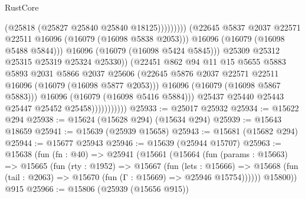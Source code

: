 \begin{lexlean}{RustCore}
\begin{coremodule}
                                                  (@25818 (@25827 @25840 @25840 @18125)))))))))
                                    (@22645
                                      @5837
                                      @2037
                                      @22571
                                      @22511
                                      @16096
                                      (@16079 (@16098 @5838 @2053)))
                                    @16096
                                    (@16079 (@16098 @5488 @5844)))
                                  @16096
                                  (@16079 (@16098 @5424 @5845)))
                                @25309
                                @25312
                                @25315
                                @25319
                                @25324
                                @25330))
                            (@22451
                              @862
                              @94
                              @11
                              @15
                              @5655
                              @5883
                              @5893
                              @2031
                              @5866
                              @2037
                              @25606
                              (@22645
                                @5876
                                @2037
                                @22571
                                @22511
                                @16096
                                (@16079 (@16098 @5877 @2053)))
                              @16096
                              (@16079 (@16098 @5867 @5883)))
                            @16096
                            (@16079 (@16098 @5416 @5884)))
                          @25437
                          @25440
                          @25443
                          @25447
                          @25452
                          @25458)))))))))))
@25933 := @25017 @25932
@25934 := @15622 @294
@25938 := @15624 (@15628 @294) (@15634 @294)
@25939 := @15643 @18659
@25941 := @15639 (@25939 @15658)
@25943 := @15681 (@15682 @294)
@25944 := @15677 @25943
@25946 := @15639 (@25944 @15707)
@25963 := @15638
    (fun (fn : @40) =>
    @25941
      (@15661
        (@15664
          (fun (params : @15663) =>
          @15665
            (fun (rty : @1952) =>
            @15667
              (fun (lets : @15666) =>
              @15668 (fun (tail : @2063) => @15670 (fun (Γ : @15669) => @25946 @15754))))))
        @15800))
    @915
@25966 := @15806 (@25939 (@15656 @915))

\end{coremodule}
\end{lexlean}
